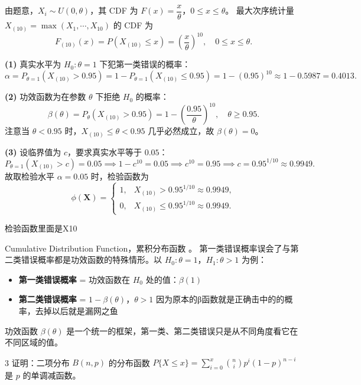 \begin{solution}
由题意，$X_i \sim U(0,\theta)$，其 CDF 为 $F(x) = \dfrac{x}{\theta}$，$0 \leq x \leq \theta$。
最大次序统计量 $X_{(10)} = \max(X_1,\cdots,X_{10})$ 的 CDF 为
\[
F_{(10)}(x) = P(X_{(10)} \leq x) = \left(\frac{x}{\theta}\right)^{10}, \quad 0 \leq x \leq \theta.
\]

\textbf{(1)} 真实水平为 $H_0: \theta = 1$ 下犯第一类错误的概率：
\[
\alpha = P_{\theta=1}(X_{(10)} > 0.95)
= 1 - P_{\theta=1}(X_{(10)} \leq 0.95)
= 1 - (0.95)^{10} \approx 1 - 0.5987 = 0.4013.
\]

\textbf{(2)} 功效函数为在参数 $\theta$ 下拒绝 $H_0$ 的概率：
\[
\beta(\theta) = P_\theta(X_{(10)} > 0.95)
= 1 - \left(\frac{0.95}{\theta}\right)^{10}, \quad \theta \geq 0.95.
\]
注意当 $\theta < 0.95$ 时，$X_{(10)} \leq \theta < 0.95$ 几乎必然成立，故 $\beta(\theta) = 0$。

\textbf{(3)} 设临界值为 $c$，要求真实水平等于 $0.05$：
\[
P_{\theta=1}(X_{(10)} > c) = 0.05
\implies 1 - c^{10} = 0.05
\implies c^{10} = 0.95
\implies c = 0.95^{1/10} \approx 0.9949.
\]
故取检验水平 $\alpha = 0.05$ 时，检验函数为
\[
\phi(\boldsymbol{X}) = \begin{cases} 1, & X_{(10)} > 0.95^{1/10} \approx 0.9949, \\ 0, & X_{(10)} \leq 0.95^{1/10} \approx 0.9949. \end{cases}
\]
\end{solution}
\begin{dxtips}
    检验函数里面是X10
\end{dxtips}
\begin{dxtips}
    Cumulative Distribution Function，累积分布函数
    。
第一类错误概率误会了与第二类错误概率都是功效函数的特殊情形。以 $H_0: \theta = 1$，$H_1: \theta > 1$ 为例：
\begin{itemize}
    \item \textbf{第一类错误概率} = 功效函数在 $H_0$ 处的值：$\beta(1)$
    \item \textbf{第二类错误概率} = $1 - \beta(\theta)$，$\theta > 1$
    因为原本的β函数就是正确击中的的概率，去掉以后就是漏网之鱼
\end{itemize}
功效函数 $\beta(\theta)$ 是一个统一的框架，第一类、第二类错误只是从不同角度看它在不同区域的值。

\end{dxtips}
\begin{homework}{3}
证明：二项分布 $B(n,p)$ 的分布函数 $P\{X \leq x\} = \displaystyle\sum_{i=0}^{x}\binom{n}{i}p^i(1-p)^{n-i}$ 是 $p$ 的单调减函数。
\end{homework}
